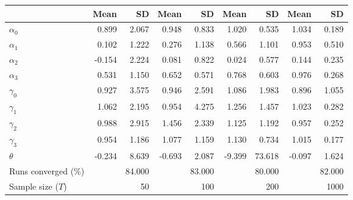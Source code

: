
\begin{tabular}[t]{lrrrrrrrr}
\toprule
  & Mean & SD & Mean  & SD  & Mean   & SD   & Mean    & SD   \\
\midrule
$\alpha_{0}$ & 0.899 & 2.067 & 0.948 & 0.833 & 1.020 & 0.535 & 1.034 & 0.189\\
$\alpha_{1}$ & 0.102 & 1.222 & 0.276 & 1.138 & 0.566 & 1.101 & 0.953 & 0.510\\
$\alpha_{2}$ & -0.154 & 2.224 & 0.081 & 0.822 & 0.024 & 0.577 & 0.144 & 0.235\\
$\alpha_{3}$ & 0.531 & 1.150 & 0.652 & 0.571 & 0.768 & 0.603 & 0.976 & 0.268\\
$\gamma_{0}$ & 0.927 & 3.575 & 0.946 & 2.591 & 1.086 & 1.983 & 0.896 & 1.055\\
$\gamma_{1}$ & 1.062 & 2.195 & 0.954 & 4.275 & 1.256 & 1.457 & 1.023 & 0.282\\
$\gamma_{2}$ & 0.988 & 2.915 & 1.456 & 2.339 & 1.125 & 1.192 & 0.957 & 0.252\\
$\gamma_{3}$ & 0.954 & 1.186 & 1.077 & 1.159 & 1.130 & 0.734 & 1.015 & 0.177\\
$\theta$ & -0.234 & 8.639 & -0.693 & 2.087 & -9.399 & 73.618 & -0.097 & 1.624\\
Runs converged (\%) &  & 84.000 &  & 83.000 &  & 80.000 &  & 82.000\\
Sample size ($T$) &  & 50 &  & 100 &  & 200 &  & 1000\\
\bottomrule
\end{tabular}

